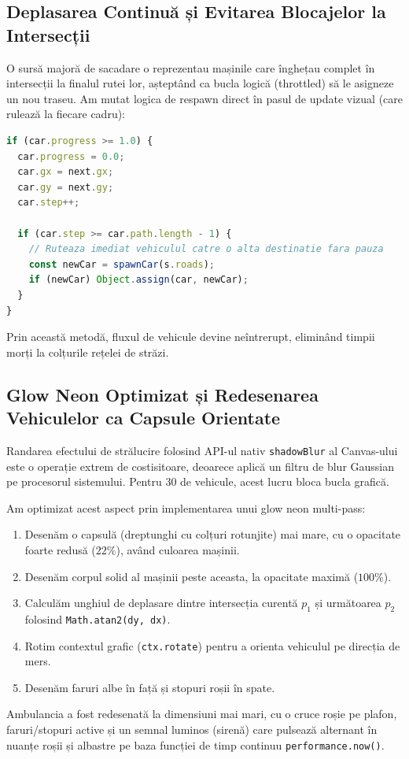 \documentclass[12pt,a4paper]{article}
\begin{document}
\subsection{Deplasarea Continuă și Evitarea Blocajelor la Intersecții}
O sursă majoră de sacadare o reprezentau mașinile care înghețau complet în intersecții la finalul rutei lor, așteptând ca bucla logică (throttled) să le asigneze un nou traseu. Am mutat logica de respawn direct în pasul de update vizual (care rulează la fiecare cadru):
\begin{lstlisting}[language=JavaScript]
if (car.progress >= 1.0) {
  car.progress = 0.0;
  car.gx = next.gx;
  car.gy = next.gy;
  car.step++;
  
  if (car.step >= car.path.length - 1) {
    // Ruteaza imediat vehiculul catre o alta destinatie fara pauza
    const newCar = spawnCar(s.roads);
    if (newCar) Object.assign(car, newCar);
  }
}
\end{lstlisting}
Prin această metodă, fluxul de vehicule devine neîntrerupt, eliminând timpii morți la colțurile rețelei de străzi.

\subsection{Glow Neon Optimizat și Redesenarea Vehiculelor ca Capsule Orientate}
 Randarea efectului de strălucire folosind API-ul nativ \texttt{shadowBlur} al Canvas-ului este o operație extrem de costisitoare, deoarece aplică un filtru de blur Gaussian pe procesorul sistemului. Pentru 30 de vehicule, acest lucru bloca bucla grafică.

Am optimizat acest aspect prin implementarea unui glow neon multi-pass:
\begin{enumerate}
    \item Desenăm o capsulă (dreptunghi cu colțuri rotunjite) mai mare, cu o opacitate foarte redusă ($22\%$), având culoarea mașinii.
    \item Desenăm corpul solid al mașinii peste aceasta, la opacitate maximă ($100\%$).
    \item Calculăm unghiul de deplasare dintre intersecția curentă $p_1$ și următoarea $p_2$ folosind \texttt{Math.atan2(dy, dx)}.
    \item Rotim contextul grafic (\texttt{ctx.rotate}) pentru a orienta vehiculul pe direcția de mers.
    \item Desenăm faruri albe în față și stopuri roșii în spate.
\end{enumerate}
Ambulancia a fost redesenată la dimensiuni mai mari, cu o cruce roșie pe plafon, faruri/stopuri active și un semnal luminos (sirenă) care pulsează alternant în nuanțe roșii și albastre pe baza funcției de timp continuu \texttt{performance.now()}.
\end{document}
